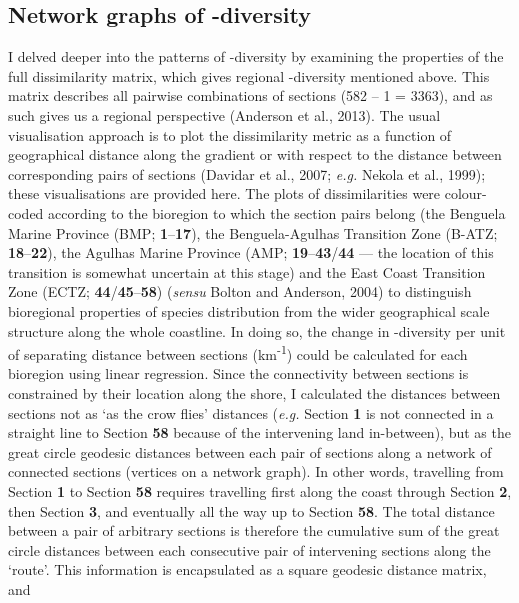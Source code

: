 \documentclass[10pt,A4,]{article}
\begin{document}
\subsection*{Network graphs of \textbeta-diversity}

I delved deeper into the patterns of \textbeta-diversity by examining
the properties of the full dissimilarity matrix, which gives regional
\textbeta-diversity mentioned above. This matrix describes all pairwise
combinations of sections (582 -- 1 = 3363), and as such gives us a
regional perspective (Anderson et al., 2013). The usual visualisation
approach is to plot the dissimilarity metric as a function of
geographical distance along the gradient or with respect to the distance
between corresponding pairs of sections (Davidar et al., 2007;
\emph{e.g.} Nekola et al., 1999); these visualisations are provided
here. The plots of dissimilarities were colour-coded according to the
bioregion to which the section pairs belong (the Benguela Marine
Province (BMP; \textbf{1}--\textbf{17}), the Benguela-Agulhas Transition
Zone (B-ATZ; \textbf{18}--\textbf{22}), the Agulhas Marine Province
(AMP; \textbf{19}--\textbf{43}/\textbf{44} --- the location of this
transition is somewhat uncertain at this stage) and the East Coast
Transition Zone (ECTZ; \textbf{44}/\textbf{45}--\textbf{58})
(\emph{sensu} Bolton and Anderson, 2004) to distinguish bioregional
properties of species distribution from the wider geographical scale
structure along the whole coastline. In doing so, the change in
\textbeta-diversity per unit of separating distance between sections
(km\textsuperscript{-1}) could be calculated for each bioregion using
linear regression. Since the connectivity between sections is
constrained by their location along the shore, I calculated the
distances between sections not as `as the crow ﬂies' distances
(\emph{e.g.} Section \textbf{1} is not connected in a straight line to
Section \textbf{58} because of the intervening land in-between), but as
the great circle geodesic distances between each pair of sections along
a network of connected sections (vertices on a network graph). In other
words, travelling from Section \textbf{1} to Section \textbf{58}
requires travelling first along the coast through Section \textbf{2},
then Section \textbf{3}, and eventually all the way up to Section
\textbf{58}. The total distance between a pair of arbitrary sections is
therefore the cumulative sum of the great circle distances between each
consecutive pair of intervening sections along the `route'. This
information is encapsulated as a square geodesic distance matrix, and
\end{document}
